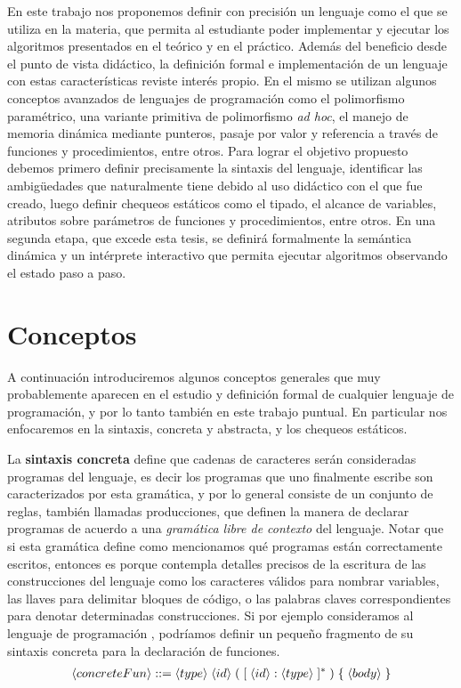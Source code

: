 
En este trabajo nos proponemos definir con precisión un lenguaje como el que se utiliza en la materia, que permita al estudiante poder implementar y ejecutar los algoritmos presentados en el teórico y en el práctico.
Además del beneficio desde el punto de vista didáctico, la definición formal e implementación de un lenguaje con estas características reviste interés propio.
En el mismo se utilizan algunos conceptos avanzados de lenguajes de programación como el polimorfismo paramétrico, una variante primitiva de polimorfismo \textit{ad hoc}, el manejo de memoria dinámica mediante punteros, pasaje por valor y referencia a través de funciones y procedimientos, entre otros.
Para lograr el objetivo propuesto debemos primero definir precisamente la sintaxis del lenguaje, identificar las ambigüedades que naturalmente tiene debido al uso didáctico con el que fue creado, luego definir chequeos estáticos como el tipado, el alcance de variables, atributos sobre parámetros de funciones y procedimientos, entre otros.
En una segunda etapa, que excede esta tesis, se definirá formalmente la semántica dinámica y un intérprete interactivo que permita ejecutar algoritmos observando el estado paso a paso.

\section{Conceptos}

A continuación introduciremos algunos conceptos generales que muy probablemente aparecen en el estudio y definición formal de cualquier lenguaje de programación, y por lo tanto también en este trabajo puntual.
En particular nos enfocaremos en la sintaxis, concreta y abstracta, y los chequeos estáticos.

La \textbf{sintaxis concreta} define que cadenas de caracteres serán consideradas programas del lenguaje, es decir los programas que uno finalmente escribe son caracterizados por esta gramática, y por lo general consiste de un conjunto de reglas, también llamadas producciones, que definen la manera de declarar programas de acuerdo a una \textit{gramática libre de contexto} del lenguaje.
Notar que si esta gramática define como mencionamos qué programas están correctamente escritos, entonces es porque contempla detalles precisos de la escritura de las construcciones del lenguaje como los caracteres válidos para nombrar variables, las llaves para delimitar bloques de código, o las palabras claves correspondientes para denotar determinadas construcciones.
Si por ejemplo consideramos al lenguaje de programación \C{}, podríamos definir un pequeño fragmento de su sintaxis concreta para la declaración de funciones.
\begin{gather*}
\langle concreteFun \rangle ::= \langle type \rangle \; \langle id \rangle \; ( \; [ \; \langle id \rangle : \langle type \rangle \; ]^* \; ) \; \{ \; \langle body \rangle \; \}
\end{gather*}

